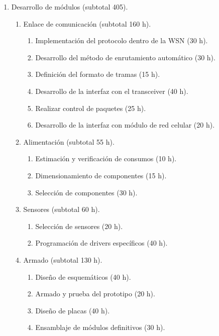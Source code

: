 \documentclass[
11pt, %
codirector, %
]{charter}
\begin{document}
\begin{enumerate}
\item Desarrollo de módulos (subtotal 405).

	\begin{enumerate}
	
	\item Enlace de comunicación (subtotal 160 h).
		\begin{enumerate}
			\item Implementación del protocolo dentro de la WSN (30 h).
			\item Desarrollo del método de enrutamiento automático (30 h).
			\item Definición del formato de tramas (15 h).
			\item Desarrollo de la interfaz con el transceiver (40 h).
			\item Realizar control de paquetes (25 h).
			\item Desarrollo de la interfaz con módulo de red celular (20 h).
			
		\end{enumerate}
		
	\item Alimentación (subtotal 55 h).
	
		\begin{enumerate}
			\item Estimación y verificación de consumos (10 h).
			\item Dimensionamiento de componentes (15 h).
			\item Selección de componentes (30 h).
			
		\end{enumerate}
		
	\item Sensores (subtotal 60 h).
	
		\begin{enumerate}
			\item Selección de sensores (20 h).
			\item Programación de drivers específicos (40 h).
		\end{enumerate}
	
	\item Armado (subtotal 130 h).
	
		\begin{enumerate}
			\item Diseño de esquemáticos (40 h).
			\item Armado y prueba del prototipo (20 h).
			\item Diseño de placas (40 h).
			\item Ensamblaje de módulos definitivos (30 h).
		

\end{enumerate}
\end{enumerate}
\end{enumerate}
\end{document}
